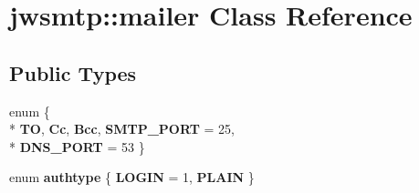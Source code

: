 \hypertarget{classjwsmtp_1_1mailer}{\section{jwsmtp\-:\-:mailer Class Reference}
\label{classjwsmtp_1_1mailer}
}
\subsection*{Public Types}
\begin{DoxyCompactItemize}
\item 
enum \{ \\*
{\bfseries T\-O}, 
{\bfseries Cc}, 
{\bfseries Bcc}, 
{\bfseries S\-M\-T\-P\-\_\-\-P\-O\-R\-T} = 25, 
\\*
{\bfseries D\-N\-S\-\_\-\-P\-O\-R\-T} = 53
 \}
\item 
enum {\bfseries authtype} \{ {\bfseries L\-O\-G\-I\-N} = 1, 
{\bfseries P\-L\-A\-I\-N}
 \}
\end{DoxyCompactItemize}
